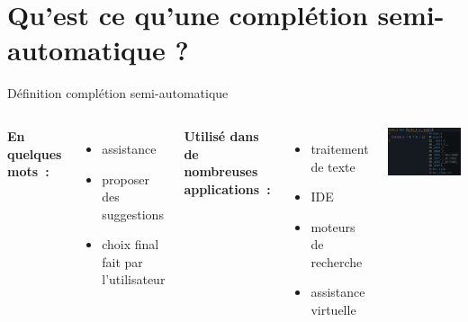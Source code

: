 
\section{Qu'est ce qu'une complétion semi-automatique ?}

\begin{frame}{Définition complétion semi-automatique}
	\begin{columns}
		
		\textbf{En quelques mots~:}
		\begin{itemize}
			\item assistance
			\item proposer des suggestions
			\item choix final fait par l'utilisateur
		\end{itemize}
		\vfill	
		\textbf{Utilisé dans de nombreuses applications~:}
		\begin{itemize}
			\item traitement de texte
			\item IDE
			\item moteurs de recherche
			\item assistance virtuelle
		\end{itemize}
		\includegraphics[width=\textwidth]{images/exemple_completion_semi_auto.png}
		
	\end{columns}
\end{frame}


